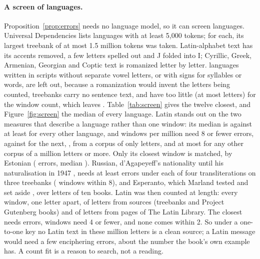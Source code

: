 \documentclass[11pt]{article}
\theoremstyle{definition}
\begin{document}
\paragraph{A screen of languages.} Proposition~\ref{prop:errors} needs no language model, so it can screen languages. Universal Dependencies lists \allListed{} languages with at least 5,000 tokens; for each, its largest treebank of at most 1.5 million tokens was taken. Latin-alphabet text has its accents removed, a few letters spelled out and J folded into I; Cyrillic, Greek, Armenian, Georgian and Coptic text is romanized letter by letter. \allSkippedScript{} languages written in scripts without separate vowel letters, or with signs for syllables or words, are left out, because a romanization would invent the letters being counted, \allSkippedEmpty{} treebanks carry no sentence text, and \allSkippedShort{} have too little (at most \allSkippedShortMost{} letters) for the window count, which leaves \allLanguages{}. Table~\ref{tab:screen} gives the twelve closest, and Figure~\ref{fig:screen} the median of every language. Latin stands out on the two measures that describe a language rather than one window: its median is \allLatinMedian{} against at least \allOthersMedianLow{} for every other language, and \allLatinRate{} windows per million need 8 or fewer errors, against \allSecondRate{} for the next, \allSecondRateName{}, from a corpus of only \allSecondRateLetters{} letters, and at most \allBigRateHigh{} for any other corpus of a million letters or more. Only its closest window is matched, by Estonian (\allEstonianFewest{} errors, median \allEstonianMedian{}). Russian, d'Agapeyeff's nationality until his naturalisation in 1947 \cite{gazette1947}, needs at least \ruFewest{} errors under each of four transliterations on three treebanks (\ruWithin{} windows within 8), and Esperanto, which Marland tested and set aside \cite{marland2026}, \eoFewest{} over \eoLetters{} letters of ten books. Latin was then counted at length: every window, one letter apart, of \libLetters{} letters from \libSources{} sources (treebanks and Project Gutenberg books) and of \llLetters{} letters from \llPages{} pages of The Latin Library. The closest needs \llFewest{} errors, \llWithinFour{} windows need 4 or fewer, and none comes within 2. So under a one-to-one key no Latin text in these \latinLettersAll{} million letters is a clean source; a Latin message would need a few enciphering errors, about the number the book's own example has. A count fit is a reason to search, not a reading.
\end{document}
